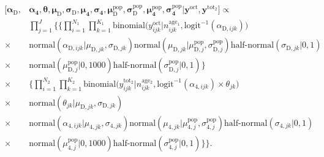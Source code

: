 \documentclass[12pt, oneside, titlepage]{article}   	%
\begin{document}
\begin{align}
  \begin{split}
  [  \bm{\alpha_\mathrm{D}} , &  \bm{\alpha_4}, \bm{\theta}, \bm{\mu_\mathrm{D}} , \bm{\sigma_\mathrm{D}} , \bm{\mu_4} , \bm{\sigma_4} , \bm{\mu^\mathrm{pop}_\mathrm{D}}, \bm{\sigma^\mathrm{pop}_\mathrm{D}} , \bm{\mu^\mathrm{pop}_4}, \bm{\sigma^\mathrm{pop}_4} | \bm{y^\mathrm{oct}} , \bm{y^\mathrm{tot_2}}  ]  \propto  \\  
 	     & \prod_{j=1}^{J} \bigg\{ \Big\{ \prod_{i=1}^{N_1}  \prod_{k=1}^{K_1} \mathrm{binomial} \big( y^{\mathrm{oct}}_{ijk} | n^\mathrm{age_1}_{ijk}, \mathrm{logit}^{-1}( \alpha_{\mathrm{D},ijk} ) \big) \\
	      \times & \mathrm{normal} ( \alpha_{\mathrm{D},ijk}  | \mu_{\mathrm{D},jk}, \sigma{_{\mathrm{D},jk} }) \mathrm{normal} ( \mu_{\mathrm{D},jk}  | \mu^\mathrm{pop}_{\mathrm{D},j}, \sigma^\mathrm{pop}_{\mathrm{D},j} ) 
 \textrm{half-normal} ( \sigma_{\mathrm{D},jk} | 0,1) \\
 \times & \mathrm{normal} ( \mu^\mathrm{pop}_{\mathrm{D},j} | 0 , 1000 ) \textrm{half-normal} ( \sigma^\mathrm{pop}_{\mathrm{D},j} | 0,1)   \Big\}  \\
  \times &  \Big\{ \prod_{i=1}^{N_2}  \prod_{k=1}^{K_2}   \mathrm{binomial} \big( y^{\mathrm{tot_2}}_{ijk} | n^\mathrm{age_2}_{ijk}, \mathrm{logit}^{-1}( \alpha_{\mathrm{4},ijk} ) \times \theta_{jk} \big) \\
   \times & \mathrm{normal} ( \theta_{jk}  | \mu_{\mathrm{D},jk}, \sigma{_{\mathrm{D},jk} }) \\
    \times & \mathrm{normal} ( \alpha_{\mathrm{4},ijk}  | \mu_{\mathrm{4},jk}, \sigma{_{\mathrm{4},jk} }) \mathrm{normal} ( \mu_{\mathrm{4},jk}  | \mu^\mathrm{pop}_{\mathrm{4},j}, \sigma^\mathrm{pop}_{\mathrm{4},j} ) \textrm{half-normal} ( \sigma_{\mathrm{4},jk} | 0,1) \\
    \times & \mathrm{normal} ( \mu^\mathrm{pop}_{\mathrm{4},j} | 0 , 1000 ) \textrm{half-normal} ( \sigma^\mathrm{pop}_{\mathrm{4},j} | 0,1) \Big\}  \bigg\}.
  \end{split}
\end{align}

\fi
\end{document}

